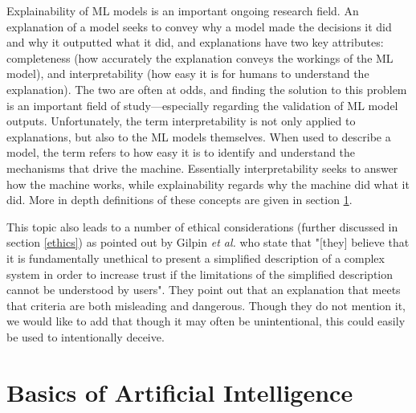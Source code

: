 \documentclass[]{article}
\begin{document}
			Explainability of ML models is an important ongoing research field. An explanation of a model seeks to convey why a model made the decisions it did and why it outputted what it did, and explanations have two key attributes: completeness (how accurately the explanation conveys the workings of the ML model), and interpretability (how easy it is for humans to understand the explanation). The two are often at odds, and finding the solution to this problem is an important field of study\cite{8631448}---especially regarding the validation of ML model outputs.\cite{10.1145/3328519.3329126} Unfortunately, the term interpretability is not only applied to explanations, but also to the ML models themselves. When used to describe a model, the term refers to how easy it is to identify and understand the mechanisms that drive the machine. Essentially interpretability seeks to answer how the machine works, while explainability regards why the machine did what it did.\cite{8631448} More in depth definitions of these concepts are given in section \ref{introtoai}.

			This topic also leads to a number of ethical considerations (further discussed in section \ref{ethics}) as pointed out by Gilpin \emph{et al.} who state that "[they] believe that it is fundamentally unethical to present a simplified description of a complex system in order to increase trust if the limitations of the simplified description cannot be understood by users". They point out that an explanation that meets that criteria are both misleading and dangerous.\cite{8631448} Though they do not mention it, we would like to add that though it may often be unintentional, this could easily be used to intentionally deceive. 
			
	\section{Basics of Artificial Intelligence}\label{introtoai}
		
\end{document}
